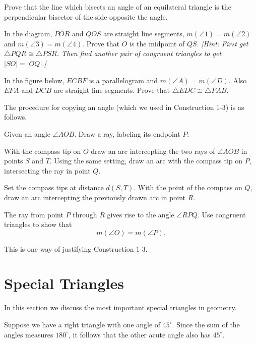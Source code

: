 \documentclass[12pt]{book} %
\begin{document}
\begin{ExerciseList}
\Exercise Prove that the line which bisects an angle of an equilateral triangle is the perpendicular bisector of the side opposite the angle.

\Exercise In the diagram, $POR$ and $QOS$ are straight line segments, $m(\angle 1)=m(\angle 2)$ and $m(\angle 3)=m(\angle 4)$. Prove that $O$ is the midpoint of $QS$. \textit{[Hint: First get $\triangle PQR\cong\triangle PSR$. Then find another pair of congruent triangles to get $|SO|=|OQ|$.]}


\Exercise In the figure below, $ECBF$ is a parallelogram and $m(\angle A)=m(\angle D)$. Also $EFA$ and $DCB$ are straight line segments. Prove that $\triangle EDC\cong\triangle FAB$.


\Exercise The procedure for copying an angle (which we used in Construction 1-3) is as follows.

Given an angle $\angle AOB$. Draw a ray, labeling its endpoint $P$:


With the compass tip on $O$ draw an arc intercepting the two rays of $\angle AOB$ in points $S$ and $T$. Using the same setting, draw an arc with the compass tip on $P$, intersecting the ray in point $Q$.


Set the compass tips at distance $d(S,T)$. With the point of the compass on $Q$, draw an arc intercepting the previously drawn arc in point $R$.


The ray from point $P$ through $R$ gives rise to the angle $\angle RPQ$.
Use congruent triangles to show that
\[
m(\angle O)=m(\angle P).
\]

This is one way of justifying Construction 1-3.
\end{ExerciseList}

\section{Special Triangles}

In this section we discuss the most important special triangles in geometry.

Suppose we have a right triangle with one angle of $45^\circ$. Since the sum of the angles measures $180^\circ$, it follows that the other acute angle also has $45^\circ$.
\end{document}

